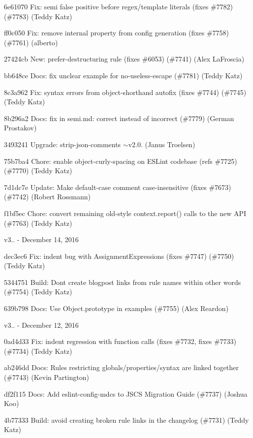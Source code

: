 \begin{DoxyItemize}
\item 6e61070 Fix\+: {\ttfamily semi} false positive before regex/template literals (fixes \#7782) (\#7783) (Teddy Katz)
\item ff0c050 Fix\+: remove internal property from config generation (fixes \#7758) (\#7761) (alberto)
\item 27424cb New\+: {\ttfamily prefer-\/destructuring} rule (fixes \#6053) (\#7741) (Alex La\+Froscia)
\item bb648ce Docs\+: fix unclear example for no-\/useless-\/escape (\#7781) (Teddy Katz)
\item 8c3a962 Fix\+: syntax errors from object-\/shorthand autofix (fixes \#7744) (\#7745) (Teddy Katz)
\item 8b296a2 Docs\+: fix in semi.\+md\+: correct instead of incorrect (\#7779) (German Prostakov)
\item 3493241 Upgrade\+: strip-\/json-\/comments $\sim$v2.0. (Janus Troelsen)
\item 75b7ba4 Chore\+: enable object-\/curly-\/spacing on E\+S\+Lint codebase (refs \#7725) (\#7770) (Teddy Katz)
\item 7d1dc7e Update\+: Make default-\/case comment case-\/insensitive (fixes \#7673) (\#7742) (Robert Rossmann)
\item f1bf5ec Chore\+: convert remaining old-\/style context.\+report() calls to the new A\+PI (\#7763) (Teddy Katz)
\end{DoxyItemize}

v3.. -\/ December 14, 2016


\begin{DoxyItemize}
\item dec3ec6 Fix\+: indent bug with Assignment\+Expressions (fixes \#7747) (\#7750) (Teddy Katz)
\item 5344751 Build\+: Don\textquotesingle{}t create blogpost links from rule names within other words (\#7754) (Teddy Katz)
\item 639b798 Docs\+: Use {\ttfamily Object.\+prototype} in examples (\#7755) (Alex Reardon)
\end{DoxyItemize}

v3.. -\/ December 12, 2016


\begin{DoxyItemize}
\item 0ad4d33 Fix\+: {\ttfamily indent} regression with function calls (fixes \#7732, fixes \#7733) (\#7734) (Teddy Katz)
\item ab246dd Docs\+: Rules restricting globals/properties/syntax are linked together (\#7743) (Kevin Partington)
\item df2f115 Docs\+: Add eslint-\/config-\/mdcs to J\+S\+CS Migration Guide (\#7737) (Joshua Koo)
\item 4b77333 Build\+: avoid creating broken rule links in the changelog (\#7731) (Teddy Katz)
\end{DoxyItemize}

